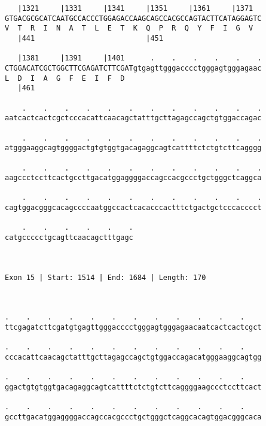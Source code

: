 \documentclass{article}
\begin{document}
\begin{Verbatim}
   |1321     |1331     |1341     |1351     |1361     |1371  
GTGACGCGCATCAATGCCACCCTGGAGACCAAGCAGCCACGCCAGTACTTCATAGGAGTC
V  T  R  I  N  A  T  L  E  T  K  Q  P  R  Q  Y  F  I  G  V  
   |441                          |451                       
  
   |1381     |1391     |1401      .    .    .    .    .    .
CTGGACATCGCTGGCTTCGAGATCTTCGATgtgagttgggacccctgggagtgggagaac
L  D  I  A  G  F  E  I  F  D                                
   |461                                                     
  
    .    .    .    .    .    .    .    .    .    .    .    .
aatcactcactcgctcccacattcaacagctatttgcttagagccagctgtggaccagac
                                                            
    .    .    .    .    .    .    .    .    .    .    .    .
atgggaaggcagtggggactgtgtggtgacagaggcagtcattttctctgtcttcagggg
                                                            
    .    .    .    .    .    .    .    .    .    .    .    .
aagccctccttcactgccttgacatggaggggaccagccacgccctgctgggctcaggca
                                                            
    .    .    .    .    .    .    .    .    .    .    .    .
cagtggacgggcacagccccaatggccactcacacccactttctgactgctcccacccct
                                                            
    .    .    .    .    .    .
catgccccctgcagttcaacagctttgagc
                              
                              
 
Exon 15 | Start: 1514 | End: 1684 | Length: 170



.    .    .    .    .    .    .    .    .    .    .    .    
ttcgagatcttcgatgtgagttgggacccctgggagtgggagaacaatcactcactcgct
                                                            
.    .    .    .    .    .    .    .    .    .    .    .    
cccacattcaacagctatttgcttagagccagctgtggaccagacatgggaaggcagtgg
                                                            
.    .    .    .    .    .    .    .    .    .    .    .    
ggactgtgtggtgacagaggcagtcattttctctgtcttcaggggaagccctccttcact
                                                            
.    .    .    .    .    .    .    .    .    .    .    .    
gccttgacatggaggggaccagccacgccctgctgggctcaggcacagtggacgggcaca
                                                            

\end{Verbatim}
\end{document}
